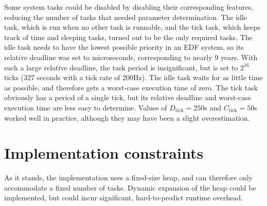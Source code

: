 Some system tasks could be disabled by disabling their corresponding features, reducing the number of tasks that needed parameter determination. The idle task, which is run when no other task is runnable, and the tick task, which keeps track of time and sleeping tasks, turned out to be the only required tasks. The idle task needs to have the lowest possible priority in an EDF system, so its relative deadline was set to  microseconds, corresponding to nearly 9 years. With such a large relative deadline, the task period is insignificant, but is set to $2^{16}$ ticks (327 seconds with a tick rate of 200Hz). The idle task waits for as little time as possible, and therefore gets a worst-case execution time of zero. The tick task obviously has a period of a single tick, but its relative deadline and worst-case execution time are less easy to determine. Values of $D_\text{tick} = 250$\textmu s and $C_\text{tick} = 50$\textmu s worked well in practice, although they may have been a slight overestimation.


\section{Implementation constraints}
As it stands, the implementation uses a fixed-size heap, and can therefore only accommodate a fixed number of tasks. Dynamic expansion of the heap could be implemented, but could incur significant, hard-to-predict runtime overhead.

